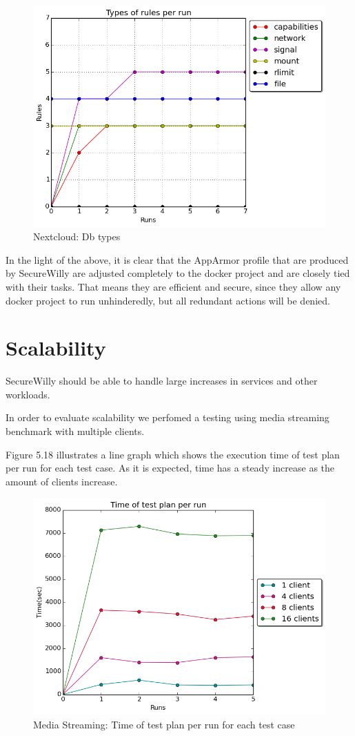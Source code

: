 \begin{figure}[h!]
  \centering
   \includegraphics[width=0.68\linewidth]{./figures/nextcloud/types_db.png}
   \caption{Nextcloud: Db types}
\end{figure}
In the light of the above, it is clear that the AppArmor profile that are produced by SecureWilly are adjusted completely to the docker project and are closely tied with their tasks. That means they are efficient and secure, since they allow any docker project to run unhinderedly, but all redundant actions will be denied.\\

\section{Scalability}
SecureWilly should be able to handle large increases in services and other workloads. 

In order to evaluate scalability we perfomed a testing using media streaming benchmark with multiple clients.

Figure 5.18 illustrates a line graph which shows the execution time of test plan per run for each test case. As it is expected, time has a steady increase as the amount of clients increase.

\begin{figure}[h!]
  \centering
   \includegraphics[width=0.8\linewidth]{./figures/scalability/time1_4_8_16.png}
   \caption{Media Streaming: Time of test plan per run for each test case}
\end{figure}

